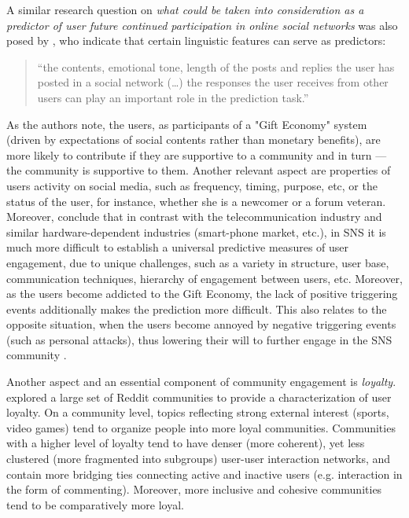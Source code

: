 \documentclass[a4paper,fleqn]{cas-dc}
\begin{document}
A similar research question on \emph{what could be taken into consideration as a predictor of user future continued participation in online social networks} was also posed by \citet{sadeque2019predicting}, who indicate that certain linguistic features can serve as predictors:
\begin{quote}``the contents, emotional tone, length of the posts and replies the user has posted in a social network (\dots) the responses the user receives from other users can play an important role in the prediction task.''\end{quote}
As the authors note, the users, as participants of a "Gift Economy" system (driven by expectations of social contents rather than monetary benefits), are more likely to contribute if they are supportive to a community and in turn --- the community is supportive to them. 
Another relevant aspect are properties of  users activity on social media, such as 
frequency, timing, purpose, etc, or the status of the user, for instance,  whether she is a newcomer or a forum veteran. 
Moreover, \citet{sadeque2019predicting} conclude that 
in contrast with 
the telecommunication industry and similar hardware-dependent industries (smart-phone market, etc.), in SNS it is much more difficult to establish a universal  predictive measures of user engagement, due to unique challenges, such as a variety in structure, user base, communication techniques, hierarchy of engagement between users, etc. Moreover, as the users become addicted to the Gift Economy, the lack of positive triggering events additionally makes the prediction more difficult. This also relates to the opposite situation, when the users become annoyed by negative triggering events (such as personal attacks), thus lowering their will to further engage in the SNS community \citep{barlinska2018slowami}.

Another aspect and an essential component of community engagement is  \textit{loyalty}. \citet{hamilton2017loyalty} explored a large set of Reddit communities to provide a characterization of user loyalty. On a community level, topics reflecting strong external interest (sports, video games) tend to organize people into more loyal communities. 
Communities  with a higher level of loyalty tend to have denser (more coherent), yet less clustered (more fragmented into subgroups) user-user interaction networks, and contain more bridging ties connecting active and inactive users (e.g.  interaction in the form of commenting). Moreover,  more inclusive and cohesive communities tend to be comparatively more loyal.
\end{document}
